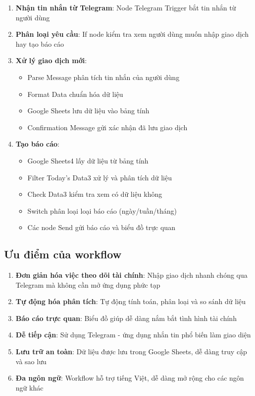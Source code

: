 \begin{enumerate}
    \item \textbf{Nhận tin nhắn từ Telegram}: Node Telegram Trigger bắt tin nhắn từ người dùng
    \item \textbf{Phân loại yêu cầu}: If node kiểm tra xem người dùng muốn nhập giao dịch hay tạo báo cáo
    \item \textbf{Xử lý giao dịch mới}:
    \begin{itemize}
        \item Parse Message phân tích tin nhắn của người dùng
        \item Format Data chuẩn hóa dữ liệu
        \item Google Sheets lưu dữ liệu vào bảng tính
        \item Confirmation Message gửi xác nhận đã lưu giao dịch
    \end{itemize}
    \item \textbf{Tạo báo cáo}:
    \begin{itemize}
        \item Google Sheets4 lấy dữ liệu từ bảng tính
        \item Filter Today's Data3 xử lý và phân tích dữ liệu
        \item Check Data3 kiểm tra xem có dữ liệu không
        \item Switch phân loại loại báo cáo (ngày/tuần/tháng)
        \item Các node Send gửi báo cáo và biểu đồ trực quan
    \end{itemize}
\end{enumerate}

\subsection{Ưu điểm của workflow}

\begin{enumerate}
    \item \textbf{Đơn giản hóa việc theo dõi tài chính}: Nhập giao dịch nhanh chóng qua Telegram mà không cần mở ứng dụng phức tạp
    \item \textbf{Tự động hóa phân tích}: Tự động tính toán, phân loại và so sánh dữ liệu
    \item \textbf{Báo cáo trực quan}: Biểu đồ giúp dễ dàng nắm bắt tình hình tài chính
    \item \textbf{Dễ tiếp cận}: Sử dụng Telegram - ứng dụng nhắn tin phổ biến làm giao diện
    \item \textbf{Lưu trữ an toàn}: Dữ liệu được lưu trong Google Sheets, dễ dàng truy cập và sao lưu
    \item \textbf{Đa ngôn ngữ}: Workflow hỗ trợ tiếng Việt, dễ dàng mở rộng cho các ngôn ngữ khác
\end{enumerate}

